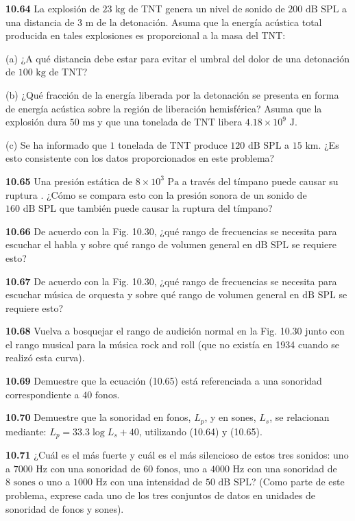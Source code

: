 \documentclass[12pt]{book}
\begin{document}
\noindent \textbf{10.64} La explosión de $23\text{ kg}$ de TNT genera un nivel de sonido de $200\text{ dB SPL}$ a una distancia de $3\text{ m}$ de la detonación. Asuma que la energía acústica total producida en tales explosiones es proporcional a la masa del TNT:

(a) ¿A qué distancia debe estar para evitar el umbral del dolor de una detonación de $100\text{ kg}$ de TNT?

(b) ¿Qué fracción de la energía liberada por la detonación se presenta en forma de energía acústica sobre la región de liberación hemisférica? Asuma que la explosión dura $50\text{ ms}$ y que una tonelada de TNT libera $4.18 \times 10^9\text{ J}$.

(c) Se ha informado que $1$ tonelada de TNT produce $120\text{ dB SPL}$ a $15\text{ km}$. ¿Es esto consistente con los datos proporcionados en este problema?

\noindent \textbf{10.65} Una presión estática de $8 \times 10^3\text{ Pa}$ a través del tímpano puede causar su ruptura \cite{11}. ¿Cómo se compara esto con la presión sonora de un sonido de $160\text{ dB SPL}$ que también puede causar la ruptura del tímpano?

\noindent \textbf{10.66} De acuerdo con la Fig. 10.30, ¿qué rango de frecuencias se necesita para escuchar el habla y sobre qué rango de volumen general en $\text{dB SPL}$ se requiere esto?

\noindent \textbf{10.67} De acuerdo con la Fig. 10.30, ¿qué rango de frecuencias se necesita para escuchar música de orquesta y sobre qué rango de volumen general en $\text{dB SPL}$ se requiere esto?

\noindent \textbf{10.68} Vuelva a bosquejar el rango de audición normal en la Fig. 10.30 junto con el rango musical para la música rock and roll (que no existía en 1934 cuando se realizó esta curva).

\noindent \textbf{10.69} Demuestre que la ecuación (10.65) está referenciada a una sonoridad correspondiente a $40\text{ fonos}$.

\noindent \textbf{10.70} Demuestre que la sonoridad en fonos, $L_p$, y en sones, $L_s$, se relacionan mediante: $L_p = 33.3 \log L_s + 40$, utilizando (10.64) y (10.65).

\noindent \textbf{10.71} ¿Cuál es el más fuerte y cuál es el más silencioso de estos tres sonidos: uno a $7000\text{ Hz}$ con una sonoridad de $60\text{ fonos}$, uno a $4000\text{ Hz}$ con una sonoridad de $8\text{ sones}$ o uno a $1000\text{ Hz}$ con una intensidad de $50\text{ dB SPL}$? (Como parte de este problema, exprese cada uno de los tres conjuntos de datos en unidades de sonoridad de fonos y sones).
\end{document}
